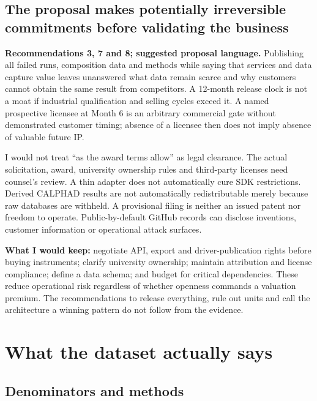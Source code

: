 \subsection{The proposal makes potentially irreversible commitments
before validating the
business}\label{the-proposal-makes-potentially-irreversible-commitments-before-validating-the-business}

\textbf{Recommendations 3, 7 and 8; suggested proposal language.}
Publishing all failed runs, composition data and methods while saying
that services and data capture value leaves unanswered what data remain
scarce and why customers cannot obtain the same result from competitors.
A 12-month release clock is not a moat if industrial qualification and
selling cycles exceed it. A named prospective licensee at Month 6 is an
arbitrary commercial gate without demonstrated customer timing; absence
of a licensee then does not imply absence of valuable future IP.

I would not treat ``as the award terms allow'' as legal clearance. The
actual solicitation, award, university ownership rules and third-party
licenses need counsel's review. A thin adapter does not automatically
cure SDK restrictions. Derived CALPHAD results are not automatically
redistributable merely because raw databases are withheld. A provisional
filing is neither an issued patent nor freedom to operate.
Public-by-default GitHub records can disclose inventions, customer
information or operational attack surfaces. \citep{InputProposal}

\textbf{What I would keep:} negotiate API, export and driver-publication
rights before buying instruments; clarify university ownership; maintain
attribution and license compliance; define a data schema; and budget for
critical dependencies. These reduce operational risk regardless of
whether openness commands a valuation premium. The recommendations to
release everything, rule out units and call the architecture a winning
pattern do not follow from the evidence.

\section{What the dataset actually
says}\label{what-the-dataset-actually-says}

\subsection{Denominators and methods}\label{denominators-and-methods}

